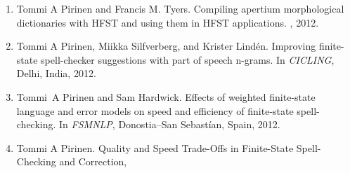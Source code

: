 \documentclass[officiallayout]{unihelcompling}
\newcommand\misspelt{\bgroup\markoverwith
{\textcolor{red}{\lower3.5pt\hbox{\sixly \char58}}}\ULon}
\begin{document}
\begin{enumerate}
    \item[\citetalias{pirinen2012compiling}]
        Tommi A Pirinen and Francis M. Tyers.
        \newblock Compiling apertium morphological dictionaries with HFST and
        using them in HFST applications.
        , 2012.
    \item[\citetalias{pirinen2012improving}]
        Tommi A Pirinen, Miikka Silfverberg, and Krister Lindén.
        \newblock Improving finite-state spell-checker suggestions with part of
        speech n-grams.
        \newblock In {\em CICLING}, Delhi, India, 2012.
    \item[\citetalias{pirinen2012effects}]
        Tommi~A Pirinen and Sam Hardwick.
        \newblock Effects of weighted finite-state language and error models on
        speed and efficiency of finite-state spell-checking.
        \newblock In {\em FSMNLP}, Donostia--San Sebastían, Spain, 2012.
    \item[\citetalias{pirinen2013quality}]
        Tommi A Pirinen.
        \newblock Quality and Speed Trade-Offs in
        Finite-State Spell-Checking and Correction, \misspelt{forthcoming}
\end{enumerate}
\end{document}
